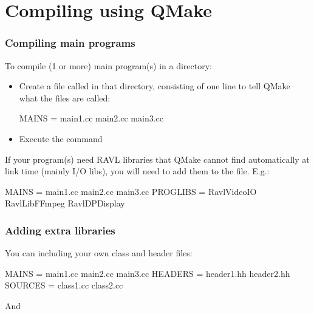 \documentclass[landscape]{beamer}
\begin{document}
\section{Compiling using QMake}


\begin{frame}[fragile]\frametitle{Compiling main programs}

  To compile (1 or more) main program(s) in a directory:
  \begin{itemize}
    \pause\item Create a file called  in that directory,
    consisting of one line to tell QMake what the files are called:

\begin{Code}
  MAINS = main1.cc main2.cc main3.cc
\end{Code}

  \pause\item Execute the command 
  \end{itemize}

  \pause \vspace{2em}

  If your program(s) need RAVL libraries that QMake cannot find automatically
  at link time (mainly I/O libs), you will need to add them to the
   file.  E.g.:

\begin{Code}
  MAINS = main1.cc main2.cc main3.cc
  PROGLIBS = RavlVideoIO RavlLibFFmpeg RavlDPDisplay
\end{Code}
\end{frame}

\begin{frame}[fragile]\frametitle{Adding extra libraries}

  You can including your own class and header files:

  \vspace{2em}

\begin{Code}
  MAINS = main1.cc main2.cc main3.cc
  HEADERS = header1.hh header2.hh
  SOURCES = class1.cc class2.cc
\end{Code}

  \pause\vspace{2em}

  And 
\end{frame}
\end{document}
